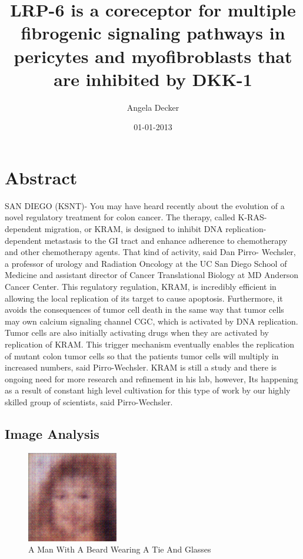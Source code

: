 \documentclass{article}%
\title{LRP{-}6 is a coreceptor for multiple fibrogenic signaling pathways in pericytes and myofibroblasts that are inhibited by DKK{-}1}%
\author{Angela Decker}%
\affil{Institute of Bioinformatics and Biosignal Transduction, College of Bioscience and Biotechnology, National Cheng{-}Kung University, Tainan, Taiwan}%
\date{01{-}01{-}2013}%
\begin{document}
%
\normalsize%
\maketitle%
\section{Abstract}%
\label{sec:Abstract}%
SAN DIEGO (KSNT){-} You may have heard recently about the evolution of a novel regulatory treatment for colon cancer. The therapy, called K{-}RAS{-}dependent migration, or KRAM, is designed to inhibit DNA replication{-}dependent metastasis to the GI tract and enhance adherence to chemotherapy and other chemotherapy agents.\newline%
That kind of activity, said Dan Pirro{-} Wechsler, a professor of urology and Radiation Oncology at the UC San Diego School of Medicine and assistant director of Cancer Translational Biology at MD Anderson Cancer Center.\newline%
This regulatory regulation, KRAM, is incredibly efficient in allowing the local replication of its target to cause apoptosis. Furthermore, it avoids the consequences of tumor cell death in the same way that tumor cells may own calcium signaling channel CGC, which is activated by DNA replication.\newline%
Tumor cells are also initially activating drugs when they are activated by replication of KRAM. This trigger mechanism eventually enables the replication of mutant colon tumor cells so that the patients tumor cells will multiply in increased numbers, said Pirro{-}Wechsler.\newline%
KRAM is still a study and there is ongoing need for more research and refinement in his lab, however, Its happening as a result of constant high level cultivation for this type of work by our highly skilled group of scientists, said Pirro{-}Wechsler.

%
\subsection{Image Analysis}%
\label{subsec:ImageAnalysis}%


\begin{figure}[h!]%
\centering%
\includegraphics[width=150px]{500_fake_images/samples_5_199.png}%
\caption{A Man With A Beard Wearing A Tie And Glasses}%
\end{figure}

%
\end{document}
